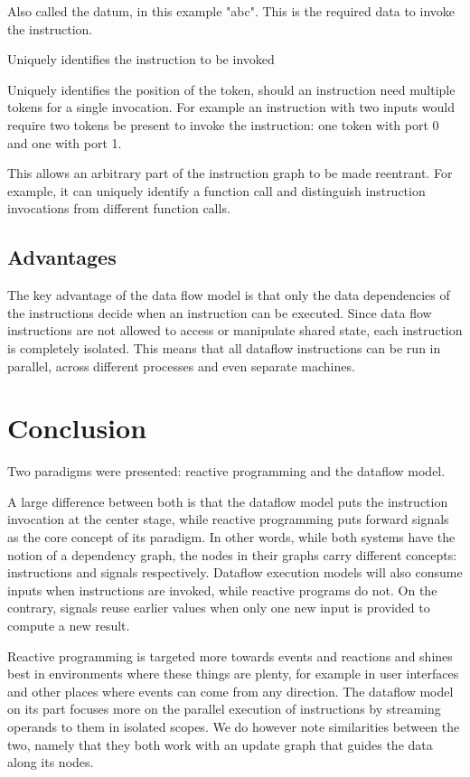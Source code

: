 \begin{description}[style=nextline]
	\item[The value] Also called the datum, in this example "abc". This is the required data to invoke the instruction.
	\item[The instruction address] Uniquely identifies the instruction to be invoked
	\item[The port] Uniquely identifies the position of the token, should an instruction need multiple tokens for a single invocation. For example an instruction with two inputs would require two tokens be present to invoke the instruction: one token with port 0 and one with port 1. 
	\item[The execution context] This allows an arbitrary part of the instruction graph to be made reentrant. For example, it can uniquely identify a function call and distinguish instruction invocations from different function calls.
\end{description}



\subsection{Advantages}

The key advantage of the data flow model is that only the data dependencies of the instructions decide when an instruction can be executed. Since data flow instructions are not allowed to access or manipulate shared state, each instruction is completely isolated. This means that all dataflow instructions can be run in parallel, across different processes and even separate machines.

\section{Conclusion}

Two paradigms were presented: reactive programming and the dataflow model. 

A large difference between both is that the dataflow model puts the instruction invocation at the center stage, while reactive programming puts forward signals as the core concept of its paradigm. In other words, while both systems have the notion of a dependency graph, the nodes in their graphs carry different concepts: instructions and signals respectively. Dataflow execution models will also consume  inputs when instructions are invoked, while reactive programs do not. On the contrary, signals reuse earlier values when only one new input is provided to compute a new result. 

Reactive programming is targeted more towards events and reactions and shines best in environments where these things are plenty, for example in user interfaces and other places where events can come from any direction. The dataflow model on its part focuses more on the parallel execution of instructions by streaming operands to them in isolated scopes. We do however note similarities between the two, namely that they both work with an update graph that guides the data along its nodes. 



